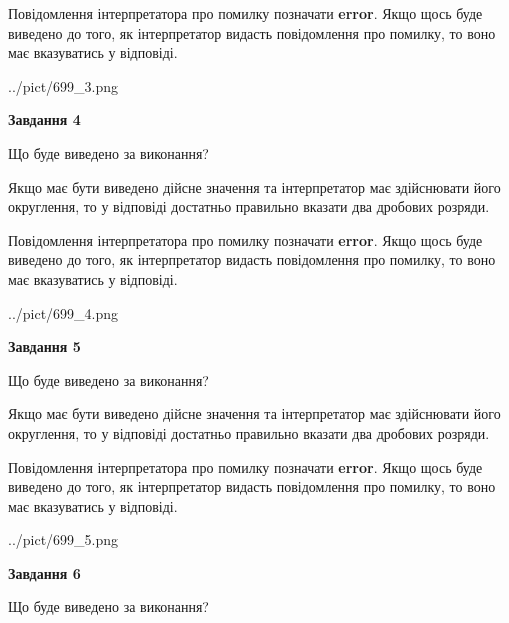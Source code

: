 \documentclass[12pt, ukrainian]{article}
\begin{document}
{\begin {Large}
Повідомлення інтерпретатора про помилку позначати \textbf{error}.
Якщо щось буде виведено до того, як інтерпретатор видасть повідомлення про помилку, 
то воно має вказуватись у відповіді. \par

\begin{center}
	{../pict/699_3.png}
\end{center}
\newpage

{\begin {center}\textbf{Завдання 4}\end {center}}\par
Що буде виведено за виконання? \par

Якщо має бути виведено дійсне значення та інтерпретатор має здійснювати його округлення, 
то у відповіді достатньо правильно вказати два дробових розряди.

Повідомлення інтерпретатора про помилку позначати \textbf{error}.
Якщо щось буде виведено до того, як інтерпретатор видасть повідомлення про помилку, 
то воно має вказуватись у відповіді. \par

\begin{center}
	{../pict/699_4.png}
\end{center}
\newpage

{\begin {center}\textbf{Завдання 5}\end {center}}\par
Що буде виведено за виконання? \par

Якщо має бути виведено дійсне значення та інтерпретатор має здійснювати його округлення, 
то у відповіді достатньо правильно вказати два дробових розряди.

Повідомлення інтерпретатора про помилку позначати \textbf{error}.
Якщо щось буде виведено до того, як інтерпретатор видасть повідомлення про помилку, 
то воно має вказуватись у відповіді. \par

\begin{center}
	{../pict/699_5.png}
\end{center}
\newpage

{\begin {center}\textbf{Завдання 6}\end {center}}\par
Що буде виведено за виконання? \par


\end{Large}}
\end{document}
